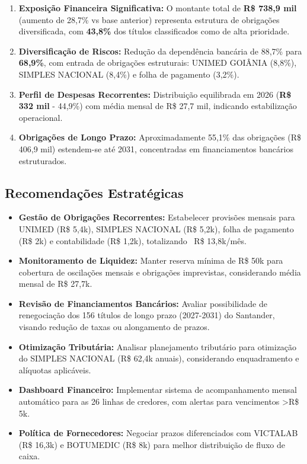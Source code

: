 \documentclass[12pt, a4paper]{article}
\newcommand{\reais}[1]{R\$ #1}
\begin{document}
\begin{enumerate}
    \item \textbf{Exposição Financeira Significativa:} O montante total de \textbf{R\$ 738,9 mil} (aumento de 28,7\% vs base anterior) representa estrutura de obrigações diversificada, com \textbf{43,8\%} dos títulos classificados como de alta prioridade.

    \item \textbf{Diversificação de Riscos:} Redução da dependência bancária de 88,7\% para \textbf{68,9\%}, com entrada de obrigações estruturais: UNIMED GOIÂNIA (8,8\%), SIMPLES NACIONAL (8,4\%) e folha de pagamento (3,2\%).

    \item \textbf{Perfil de Despesas Recorrentes:} Distribuição equilibrada em 2026 (\textbf{R\$ 332 mil} - 44,9\%) com média mensal de R\$ 27,7 mil, indicando estabilização operacional.

    \item \textbf{Obrigações de Longo Prazo:} Aproximadamente 55,1\% das obrigações (\reais{406,9 mil}) estendem-se até 2031, concentradas em financiamentos bancários estruturados.
\end{enumerate}

\subsection{Recomendações Estratégicas}

\begin{itemize}
    \item \textbf{Gestão de Obrigações Recorrentes:} Estabelecer provisões mensais para UNIMED (R\$ 5,4k), SIMPLES NACIONAL (R\$ 5,2k), folha de pagamento (R\$ 2k) e contabilidade (R\$ 1,2k), totalizando ~R\$ 13,8k/mês.

    \item \textbf{Monitoramento de Liquidez:} Manter reserva mínima de R\$ 50k para cobertura de oscilações mensais e obrigações imprevistas, considerando média mensal de R\$ 27,7k.

    \item \textbf{Revisão de Financiamentos Bancários:} Avaliar possibilidade de renegociação dos 156 títulos de longo prazo (2027-2031) do Santander, visando redução de taxas ou alongamento de prazos.

    \item \textbf{Otimização Tributária:} Analisar planejamento tributário para otimização do SIMPLES NACIONAL (R\$ 62,4k anuais), considerando enquadramento e alíquotas aplicáveis.

    \item \textbf{Dashboard Financeiro:} Implementar sistema de acompanhamento mensal automático para as 26 linhas de credores, com alertas para vencimentos >R\$ 5k.

    \item \textbf{Política de Fornecedores:} Negociar prazos diferenciados com VICTALAB (R\$ 16,3k) e BOTUMEDIC (R\$ 8k) para melhor distribuição de fluxo de caixa.
\end{itemize}
\end{document}
